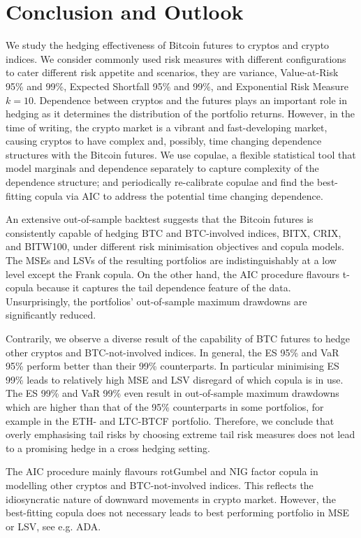\section{Conclusion and Outlook}\label{sec:conclusion-and-outlook}
We study the hedging effectiveness of Bitcoin futures to cryptos and crypto indices.
We consider commonly used risk measures with different configurations to cater different risk appetite and scenarios, they are variance, Value-at-Risk 95\% and 99\%,
Expected Shortfall 95\% and 99\%, and Exponential Risk Measure $k=10$. Dependence between cryptos and the futures plays an important role in hedging as it determines the distribution of the portfolio returns.
However, in the time of writing, the crypto market is a vibrant and fast-developing market, causing cryptos to have complex and, possibly,
time changing dependence structures with the Bitcoin futures.
We use copulae, a flexible statistical tool that model marginals and dependence separately to capture complexity of the dependence structure;
and periodically re-calibrate copulae and find the best-fitting copula via AIC to address the potential time changing dependence. \medskip

An extensive out-of-sample backtest suggests that the Bitcoin futures is consistently capable of hedging BTC and BTC-involved indices,
BITX, CRIX, and BITW100, under different risk minimisation objectives and copula models.
The MSEs and LSVs of the resulting portfolios are indistinguishably at a low level except the Frank copula.
On the other hand, the AIC procedure flavours t-copula because it captures the tail dependence feature of the data.
Unsurprisingly, the portfolios' out-of-sample maximum drawdowns are significantly reduced. \medskip

Contrarily, we observe a diverse result of the capability of BTC futures to hedge other cryptos and BTC-not-involved indices.
In general, the ES 95\% and VaR 95\% perform better than their 99\% counterparts.
In particular minimising ES 99\% leads to relatively high MSE and LSV disregard of which copula is in use.
The ES 99\% and VaR 99\% even result in out-of-sample maximum drawdowns which are higher than that of the 95\% counterparts in some portfolios,
for example in the ETH- and LTC-BTCF portfolio.
Therefore, we conclude that overly emphasising tail risks by choosing extreme tail risk measures does not lead to a promising hedge in a cross hedging setting. \medskip

The AIC procedure mainly flavours rotGumbel and NIG factor copula in modelling other cryptos and BTC-not-involved indices.
This reflects the idiosyncratic nature of downward movements in crypto market.
However, the best-fitting copula does not necessary leads to best performing portfolio in MSE or LSV, see e.g. ADA. \medskip

